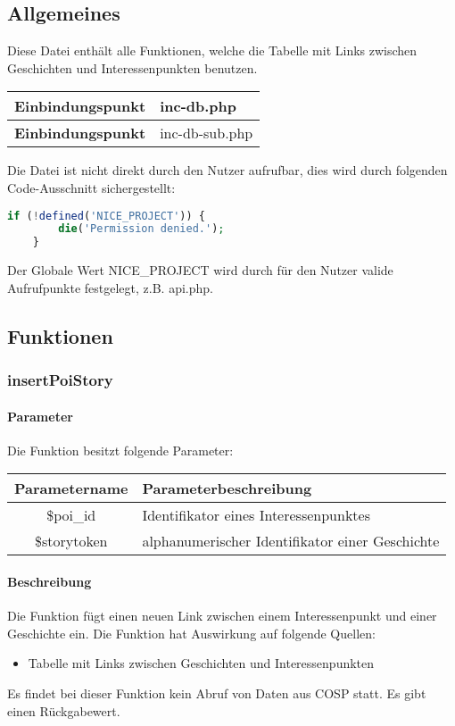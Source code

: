 \subsection{Allgemeines} Diese Datei enthält alle Funktionen, welche die Tabelle mit Links zwischen Geschichten und Interessenpunkten benutzen.
\begin{table}[H]
	\begin{tabular}{|c|p{11cm}|}
		\hline
		\textbf{Einbindungspunkt} & inc-db.php \\ \hline
		\textbf{Einbindungspunkt} & inc-db-sub.php \\ \hline
	\end{tabular}
\end{table}
Die Datei ist nicht direkt durch den Nutzer aufrufbar, dies wird durch folgenden Code-Ausschnitt sichergestellt:
\begin{lstlisting}[language=php]
	if (!defined('NICE_PROJECT')) {
		die('Permission denied.');
	}
\end{lstlisting}
Der Globale Wert {\glqq NICE\_PROJECT\grqq} wird durch für den Nutzer valide Aufrufpunkte festgelegt, z.B. {\glqq api.php\grqq}.
\newpage
\subsection{Funktionen}
\subsubsection{insertPoiStory}
\paragraph{Parameter} Die Funktion besitzt folgende Parameter:
\begin{table}[H]
	\begin{tabular}{|c|p{11cm}|}
		\hline
		\textbf{Parametername} & \textbf{Parameterbeschreibung} \\ \hline
		\$poi\_id    & Identifikator eines Interessenpunktes \\ \hline
		\$storytoken & alphanumerischer Identifikator einer Geschichte \\ \hline
	\end{tabular}
\end{table}
\paragraph{Beschreibung} Die Funktion fügt einen neuen Link zwischen einem Interessenpunkt und einer Geschichte ein. Die Funktion hat Auswirkung auf folgende Quellen:
\begin{itemize}
	\item Tabelle mit Links zwischen Geschichten und Interessenpunkten
\end{itemize}
Es findet bei dieser Funktion kein Abruf von Daten aus {\glqq COSP\grqq} statt. Es gibt einen Rückgabewert.
